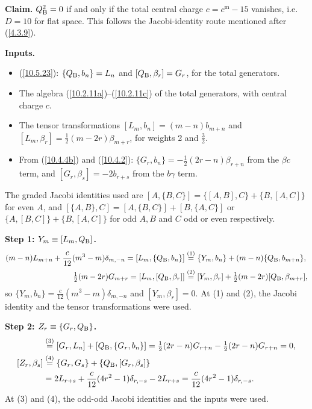 	\begin{tcolorbox}[breakable]
		\begin{remark}
			\textbf{Claim.} $Q_{\rm B}^{2}=0$ if and only if the total central charge $c=c^{\mathrm m}-15$ vanishes, i.e.\ $D=10$ for flat space. This follows the Jacobi-identity route mentioned after (\ref{4.3.9}).

			\textbf{Inputs.}
			\begin{itemize}
				\item (\ref{10.5.23}): $\{Q_{\rm B},b_n\}=L_n$ and $[Q_{\rm B},\beta_r]=G_r$, for the total generators.
				\item The algebra (\ref{10.2.11a})--(\ref{10.2.11c}) of the total generators, with central charge $c$.
				\item The tensor transformations $[L_m,b_n]=(m-n)b_{m+n}$ and $[L_m,\beta_r]=\tfrac12(m-2r)\beta_{m+r}$, for weights 2 and $\tfrac32$.
				\item From (\ref{10.4.4b}) and (\ref{10.4.2}): $\{G_r,b_n\}=-\tfrac12(2r-n)\beta_{r+n}$ from the $\beta c$ term, and $[G_r,\beta_s]=-2b_{r+s}$ from the $b\gamma$ term.
			\end{itemize}
			The graded Jacobi identities used are $[A,\{B,C\}]=\{[A,B],C\}+\{B,[A,C]\}$ for even $A$, and $[\{A,B\},C]=[A,\{B,C\}]+[B,\{A,C\}]$ or $\{A,[B,C]\}+\{B,[A,C]\}$ for odd $A,B$ and $C$ odd or even respectively.

			\textbf{Step 1: $Y_m\equiv[L_m,Q_{\rm B}]$.}
			\begin{align*}
				(m-n)L_{m+n}+\frac{c}{12}(m^{3}-m)\delta_{m,-n}=[L_m,\{Q_{\rm B},b_n\}]&\overset{(1)}{=}\{Y_m,b_n\}+(m-n)\{Q_{\rm B},b_{m+n}\},\\
				\tfrac12(m-2r)G_{m+r}=[L_m,[Q_{\rm B},\beta_r]]&\overset{(2)}{=}[Y_m,\beta_r]+\tfrac12(m-2r)[Q_{\rm B},\beta_{m+r}] ,
			\end{align*}
			so $\{Y_m,b_n\}=\tfrac{c}{12}(m^{3}-m)\delta_{m,-n}$ and $[Y_m,\beta_r]=0$. At (1) and (2), the Jacobi identity and the tensor transformations were used.

			\textbf{Step 2: $Z_r\equiv\{G_r,Q_{\rm B}\}$.}
			\begin{align*}
				[Z_r,b_n]&\eqs{3}[G_r,L_n]+[Q_{\rm B},\{G_r,b_n\}]=\tfrac12(2r-n)G_{r+n}-\tfrac12(2r-n)G_{r+n}=0,\\
				[Z_r,\beta_s]&\eqs{4}\{G_r,G_s\}+\{Q_{\rm B},[G_r,\beta_s]\}\\
				&=2L_{r+s}+\frac{c}{12}(4r^{2}-1)\delta_{r,-s}-2L_{r+s}=\frac{c}{12}(4r^{2}-1)\delta_{r,-s} .
			\end{align*}
			At (3) and (4), the odd-odd Jacobi identities and the inputs were used.


\end{remark}
\end{tcolorbox}
